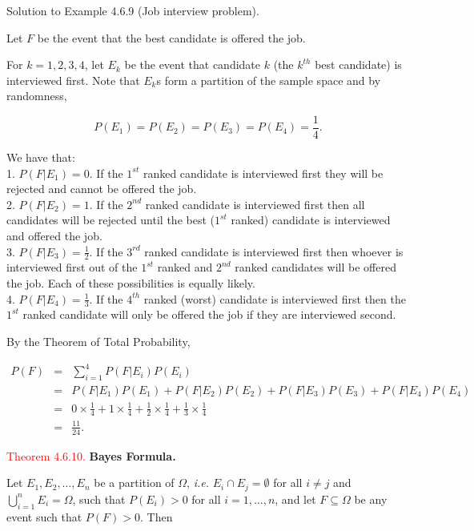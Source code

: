 \documentclass[
]{book}
\begin{document}
Solution to Example 4.6.9 (Job interview problem).

Let \(F\) be the event that the best candidate is offered the job.

For \(k=1,2,3,4\), let \(E_k\) be the event that candidate \(k\) (the \(k^{th}\) best candidate) is interviewed first. Note that \(E_k\)s form a partition of the sample space and by randomness,

\[ P(E_1) = P(E_2)=P(E_3)=P(E_4) = \frac{1}{4}. \]

We have that:\\
1. \(P(F|E_1) =0\). If the \(1^{st}\) ranked candidate is interviewed first they will be rejected and cannot be offered the job.\\
2. \(P(F|E_2) =1\). If the \(2^{nd}\) ranked candidate is interviewed first then all candidates will be rejected until the best (\(1^{st}\) ranked) candidate is interviewed and offered the job.\\
3. \(P(F|E_3) =\frac{1}{2}\). If the \(3^{rd}\) ranked candidate is interviewed first then whoever is interviewed first out of the \(1^{st}\) ranked and \(2^{nd}\) ranked candidates will be offered the job. Each of these possibilities is equally likely.\\
4. \(P(F|E_4) =\frac{1}{3}\). If the \(4^{th}\) ranked (worst) candidate is interviewed first then the \(1^{st}\) ranked candidate will only be offered the job if they are interviewed second.

By the Theorem of Total Probability,

\begin{eqnarray*}
P(F) &=& \sum_{i=1}^4 P(F|E_i) P(E_i) \\
&=& P(F |E_1) P(E_1) + P(F |E_2) P(E_2) + P(F |E_3) P(E_3) + P(F |E_4) P(E_4)   \\
&=& 0 \times \frac{1}{4} + 1 \times \frac{1}{4} + \frac{1}{2} \times \frac{1}{4}+ \frac{1}{3} \times \frac{1}{4} \\
&=& \frac{11}{24}.
\end{eqnarray*}

\hfill\break

\leavevmode{}%
\textcolor{red}{Theorem 4.6.10.}
{\textbf{Bayes Formula.}}

Let \(E_1,E_2,\dots,E_n\) be a partition of \(\Omega\), \emph{i.e.} \(E_i \cap E_j = \emptyset\) for all \(i \not= j\) and \(\bigcup\limits_{i=1}^n E_i=\Omega\), such that \(P(E_i)>0\) for all \(i=1,\dots,n\), and let \(F\subseteq\Omega\) be any event such that \(P(F)>0\). Then\\
\end{document}
